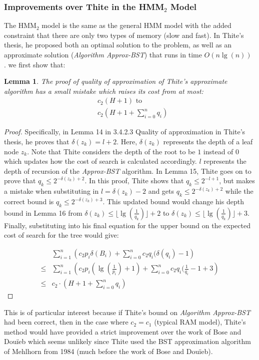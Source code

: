 \documentclass[]{beamer}
\theoremstyle{plain}
\newtheorem{lem}[thm]{Lemma}
\begin{document}
\begin{frame} \frametitle{Improvements over Thite in the HMM$_2$ Model}

The HMM$_2$ model is the same as the general HMM model with the added constraint that there are only two types of memory (slow and fast). In Thite's thesis, he proposed both an optimal solution to the problem, as well as an approximate solution (\textit{Algorithm Approx-BST}) that runs in time $O(n \lg(n))$ \cite{thite2008optimum}. we first show that:
\begin{lem}
The proof of quality of approximation of Thite's approximate algorithm has a small mistake which raises its cost from at most: 
\begin{align*}
&c_2(H+1) \text{ to} \\
&c_2(H+1+\sum_{i=0}^{n}q_i)
\end{align*}
\end{lem}

\begin{proof}
Specifically, in Lemma 14 in 3.4.2.3 Quality of approximation in Thite's thesis, he proves that $\delta(z_k) = l+2$. Here, $\delta(z_k)$ represents the depth of a leaf node $z_k$. Note that Thite considers the depth of the root to be $1$ instead of $0$ which updates how the cost of search is calculated accordingly. $l$ represents the depth of recursion of the \textit{Approx-BST} algorithm. In Lemma 15, Thite goes on to prove that $q_k \leq 2^{-\delta(z_k)+2}$. In this proof, Thite shows that $q_k \leq 2^{-l+1}$, but makes a mistake when substituting in $l=\delta(z_k)-2$ and gets $q_k \leq 2^{-\delta(z_k)+2}$ while the correct bound is $q_k \leq 2^{-\delta(z_k)+3}$. This updated bound would change his depth bound in Lemma 16 from $\delta(z_k) \leq \lfloor \lg(\frac{1}{q_k}) \rfloor + 2$ to $\delta(z_k) \leq \lfloor \lg(\frac{1}{q_k}) \rfloor + 3$. Finally, substituting into his final equation for the upper bound on the expected cost of search for the tree would give:

\begin{align*}
&\sum_{i=1}^{n} \left(c_2 p_i \delta(B_i )+ \sum_{i=0}^{n} c_2 q_i (\delta(q_i)-1 \right)\\
\leq &\sum_{i=1}^{n} \left(c_2 p_i (\lg(\frac{1}{p_i})+1)+ \sum_{i=0}^{n} c_2 q_i (\frac{1}{q_i}-1+3 \right) \\
\leq &c_2 \cdot \left(H+1+\sum_{i=0}^{n}q_i \right)
\end{align*}
\end{proof}

This is of particular interest because if Thite's bound on \textit{Algorithm Approx-BST} had been correct, then in the case where $c_2=c_1$ (typical RAM model), Thite's method would have provided a strict improvement over the work of Bose and Dou\"{i}eb \cite{bose2009efficient} which seems unlikely since Thite used the BST approximation algorithm of Mehlhorn from 1984 \cite{mehlhorn1984sorting} (much before the work of Bose and Dou\"{i}eb).


\end{frame}
\end{document}
